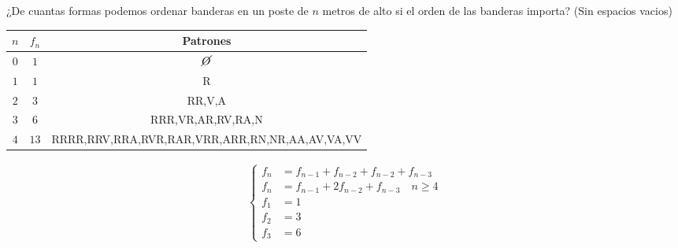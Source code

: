 \documentclass[../main.tex]{subfiles}
\begin{document}
\begin{enumerate}
		¿De cuantas formas podemos ordenar banderas en un poste de $n$ metros de alto
		si el orden de las banderas importa? (Sin espacios vacios)
		\begin{center}
			\begin{tabular}{c|c|c}
				$n$ & $f_n$ & Patrones\\
				\hline
				$0$ & $1$ & $\cancel{O}$\\
				$1$ & $1$ & R\\
				$2$ & $3$ & RR,V,A\\
				$3$ & $6$ & RRR,VR,AR,RV,RA,N\\
				$4$ & $13$ & RRRR,RRV,RRA,RVR,RAR,VRR,ARR,RN,NR,AA,AV,VA,VV\\
			\end{tabular}
		\end{center}
		\begin{align*}
			\begin{cases}
				f_n &= f_{n-1}+f_{n-2}+f_{n-2}+f_{n-3}\\
				f_n &= f_{n-1}+2f_{n-2}+f_{n-3}\quad n \geq 4\\
				f_1 &= 1\\
				f_2 &= 3\\
				f_3 &= 6
			\end{cases}
		\end{align*}
\end{enumerate}
\end{document}
